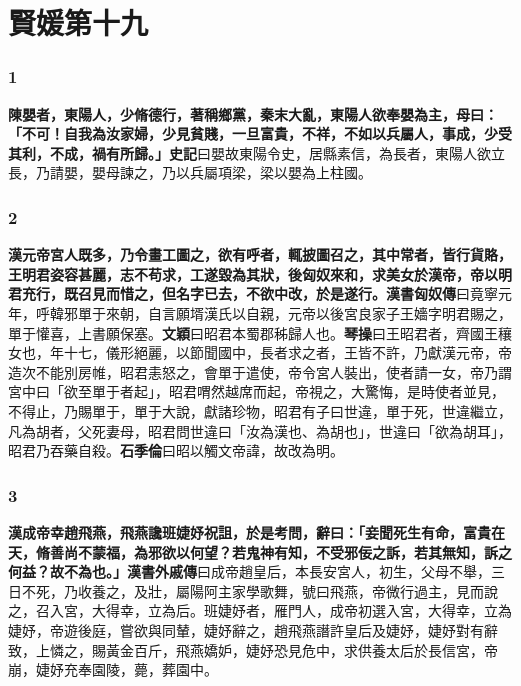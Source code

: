 \chapter{賢媛第十九}

\subsection*{1}

\textbf{陳嬰者，東陽人，少脩德行，著稱鄉黨，秦末大亂，東陽人欲奉嬰為主，母曰：「不可！自我為汝家婦，少見貧賤，一旦富貴，不祥，不如以兵屬人，事成，少受其利，不成，禍有所歸。」}{\footnotesize \textbf{史記}曰嬰故東陽令史，居縣素信，為長者，東陽人欲立長，乃請嬰，嬰母諫之，乃以兵屬項梁，梁以嬰為上柱國。}

\subsection*{2}

\textbf{漢元帝宮人既多，乃令畫工圖之，欲有呼者，輒披圖召之，其中常者，皆行貨賂，王明君姿容甚麗，志不苟求，工遂毀為其狀，後匈奴來和，求美女於漢帝，帝以明君充行，既召見而惜之，但名字已去，不欲中改，於是遂行。}{\footnotesize \textbf{漢書匈奴傳}曰竟寧元年，呼韓邪單于來朝，自言願壻漢氏以自親，元帝以後宮良家子王嬙字明君賜之，單于懽喜，上書願保塞。\textbf{文穎}曰昭君本蜀郡秭歸人也。\textbf{琴操}曰王昭君者，齊國王穰女也，年十七，儀形絕麗，以節聞國中，長者求之者，王皆不許，乃獻漢元帝，帝造次不能別房帷，昭君恚怒之，會單于遣使，帝令宮人裝出，使者請一女，帝乃謂宮中曰「欲至單于者起」，昭君喟然越席而起，帝視之，大驚悔，是時使者並見，不得止，乃賜單于，單于大說，獻諸珍物，昭君有子曰世違，單于死，世違繼立，凡為胡者，父死妻母，昭君問世違曰「汝為漢也、為胡也」，世違曰「欲為胡耳」，昭君乃吞藥自殺。\textbf{石季倫}曰昭以觸文帝諱，故改為明。}

\subsection*{3}

\textbf{漢成帝幸趙飛燕，飛燕讒班婕妤祝詛，於是考問，辭曰：「妾聞死生有命，富貴在天，脩善尚不蒙福，為邪欲以何望？若鬼神有知，不受邪佞之訴，若其無知，訴之何益？故不為也。」}{\footnotesize \textbf{漢書外戚傳}曰成帝趙皇后，本長安宮人，初生，父母不舉，三日不死，乃收養之，及壯，屬陽阿主家學歌舞，號曰飛燕，帝微行過主，見而說之，召入宮，大得幸，立為后。班婕妤者，雁門人，成帝初選入宮，大得幸，立為婕妤，帝遊後庭，嘗欲與同輦，婕妤辭之，趙飛燕譖許皇后及婕妤，婕妤對有辭致，上憐之，賜黃金百斤，飛燕嬌妒，婕妤恐見危中，求供養太后於長信宮，帝崩，婕妤充奉園陵，薨，葬園中。}

